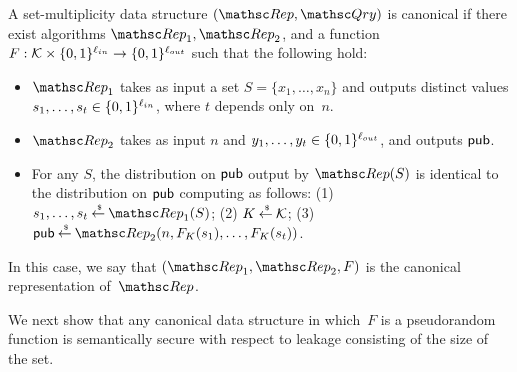 \begin{definition}
A set-multiplicity data structure $(\Rep, \Qry)$ is {\sf canonical} if
there exist algorithms $\Rep_1, \Rep_2$, and a function
$F: {\cal K} \times \{0,1\}^{\ell_{in}} \rightarrow \{0,1\}^{\ell_{out}}$
such that the following hold:
\begin{itemize}
\item $\Rep_1$ takes as input a set $S=\{x_1,\ldots,x_n\}$ and outputs distinct values $s_1, \ldots, s_t \in \{0,1\}^{\ell_{in}}$,
where $t$ depends only on~$n$.
\item $\Rep_2$ takes as input $n$ and $y_1, \ldots, y_t \in \{0,1\}^{\ell_{out}}$, and outputs
${\sf pub}$.
\item For any $S$, the distribution on ${\sf pub}$ output by $\Rep(S)$ is identical to the distribution
on ${\sf pub}$ computing as follows: 
(1) $s_1, \ldots, s_t \getsr \Rep_1(S)$;
(2) $K {\:\stackrel{{\scriptscriptstyle \hspace{0.2em}\$}} {\leftarrow}\:} {\cal K}$;
(3) $\pubaux \getsr \Rep_2(n, F_{K}(s_1), \ldots,F_{K}(s_t))$. 
\end{itemize}
In this case, we say that $(\Rep_1, \Rep_2, F)$ is the {\sf canonical representation}
of~$\Rep$. 
\end{definition}
We next show that any canonical data structure in which~$F$ is a pseudorandom function is
semantically secure with respect to leakage consisting of the size of the set.

